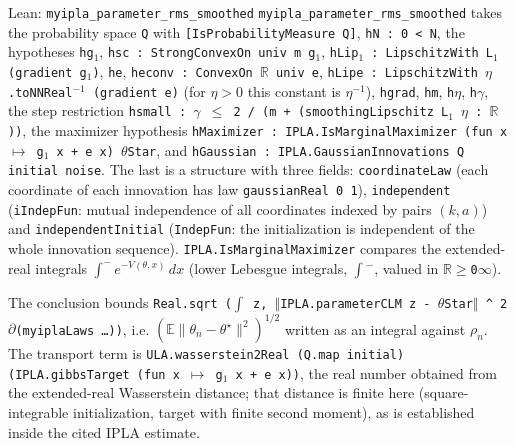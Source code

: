 \documentclass[11pt,a4paper]{report}
\begin{document}
\begin{leanbox}{Lean: \texttt{myipla\_\allowbreak{}parameter\_\allowbreak{}rms\_\allowbreak{}smoothed}}
\texttt{myipla\_\allowbreak{}parameter\_\allowbreak{}rms\_\allowbreak{}smoothed} takes the probability space \texttt{Q} with \texttt{[Is\allowbreak{}Probability\allowbreak{}Measure Q]}, \texttt{h\allowbreak{}N : 0 < N}, the hypotheses \texttt{hg\ensuremath{{}_{1}}}, \texttt{hsc : Strong\allowbreak{}Convex\allowbreak{}On univ m g\ensuremath{{}_{1}}}, \texttt{h\allowbreak{}Lip\ensuremath{{}_{1}} : Lipschitz\allowbreak{}With L\ensuremath{{}_{1}} (gradient g\ensuremath{{}_{1}})}, \texttt{he}, \texttt{heconv : Convex\allowbreak{}On \ensuremath{\mathbb R} univ e}, \texttt{h\allowbreak{}Lipe : Lipschitz\allowbreak{}With \ensuremath{\eta}.\allowbreak{}to\allowbreak{}NNReal\ensuremath{{}^{-1}} (gradient e)} (for \(\eta>0\) this constant is \(\eta^{-1}\)), \texttt{hgrad}, \texttt{hm}, \texttt{h\ensuremath{\eta}}, \texttt{h\ensuremath{\gamma}}, the step restriction \texttt{hsmall : \ensuremath{\gamma} \ensuremath{\le} 2 /\allowbreak{} (m + (smoothing\allowbreak{}Lipschitz L\ensuremath{{}_{1}} \ensuremath{\eta} : \ensuremath{\mathbb R}))}, the maximizer hypothesis \texttt{h\allowbreak{}Maximizer : IPLA.\allowbreak{}Is\allowbreak{}Marginal\allowbreak{}Maximizer (fun x \ensuremath{\mapsto} g\ensuremath{{}_{1}} x + e x) \ensuremath{\theta}\allowbreak{}Star}, and \texttt{h\allowbreak{}Gaussian : IPLA.\allowbreak{}Gaussian\allowbreak{}Innovations Q initial noise}. The last is a structure with three fields: \texttt{coordinate\allowbreak{}Law} (each coordinate of each innovation has law \texttt{gaussian\allowbreak{}Real 0 1}), \texttt{independent} (\texttt{i\allowbreak{}Indep\allowbreak{}Fun}: mutual independence of all coordinates indexed by pairs \((k,a)\)) and \texttt{independent\allowbreak{}Initial} (\texttt{Indep\allowbreak{}Fun}: the initialization is independent of the whole innovation sequence). \texttt{IPLA.\allowbreak{}Is\allowbreak{}Marginal\allowbreak{}Maximizer} compares the extended-real integrals \(\int^-e^{-V(\theta,x)}\,dx\) (lower Lebesgue integrals, \texttt{\ensuremath{\int}\ensuremath{{}^{-}}}, valued in \texttt{\ensuremath{\mathbb R}\ensuremath{\ge}0\ensuremath{\infty}}).




The conclusion bounds \texttt{Real.\allowbreak{}sqrt (\ensuremath{\int} z, \ensuremath{\Vert}IPLA.\allowbreak{}parameter\allowbreak{}CLM z -\allowbreak{} \ensuremath{\theta}\allowbreak{}Star\ensuremath{\Vert} \textasciicircum{} 2 \ensuremath{\partial}(myipla\allowbreak{}Laws …))}, i.e. \((\mathbb E\|\theta_n-\theta^\star\|^2)^{1/2}\) written as an integral against \(\rho_n\). The transport term is \texttt{ULA.\allowbreak{}wasserstein2\allowbreak{}Real (Q.\allowbreak{}map initial) (IPLA.\allowbreak{}gibbs\allowbreak{}Target (fun x \ensuremath{\mapsto} g\ensuremath{{}_{1}} x + e x))}, the real number obtained from the extended-real Wasserstein distance; that distance is finite here (square-integrable initialization, target with finite second moment), as is established inside the cited IPLA estimate.





\end{leanbox}
\end{document}
